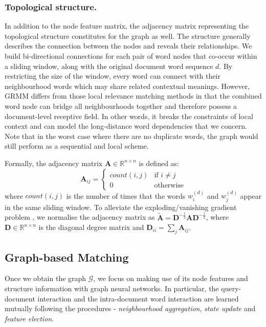\subsubsection{Topological structure.}
In addition to the node feature matrix, the adjacency matrix representing the topological structure constitutes for the graph as well. The structure generally describes the connection between the nodes and reveals their relationships. We build bi-directional connections for each pair of word nodes that co-occur within a sliding window, along with the original document word sequence $d$. By restricting the size of the window, every word can connect with their neighbourhood words which may share related contextual meanings. However, GRMM differs from those local relevance matching methods in that the combined word node can bridge all neighbourhoods together and therefore possess a document-level receptive field. In other words, it breaks the constraints of local context and can model the long-distance word dependencies that we concern. Note that in the worst case where there are no duplicate words, the graph would still perform as a sequential and local scheme. 

Formally, the adjacency matrix $\mathbf{A} \in \mathbb{R}^{n \times n}$ is defined as:
\begin{equation}
\mathbf{A}_{i j}=\left\{\begin{array}{ll}
count(i, j) & \text{if } i \not= j \\
0 & \text{otherwise}
\end{array}\right.
\end{equation}
where $count(i, j)$ is the number of times that the words $w_{i}^{(d)}$ and $w_{j}^{(d)}$ appear in the same sliding window. To alleviate the exploding/vanishing gradient problem \cite{kipf2017semi}, we normalise the adjacency matrix as $\tilde{\mathbf{A}} = \mathbf{D}^{-\frac{1}{2}} \mathbf{A} \mathbf{D}^{-\frac{1}{2}}$, where $\mathbf{D} \in \mathbb{R}^{n \times n}$ is the diagonal degree matrix and $\mathbf{D}_{ii} = \sum_j \mathbf{A}_{ij}$.



\subsection{Graph-based Matching}
Once we obtain the graph $\mathcal{G}$, we focus on making use of its node features and structure information with graph neural networks. In particular, the query-document interaction and the intra-document word interaction are learned mutually following the procedures - \emph{neighbourhood aggregation}, \emph{state update} and \emph{feature election}. 

